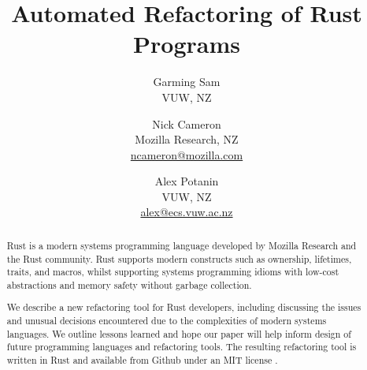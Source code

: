 \documentclass{sig-alternate-05-2015}
\begin{document}
\title{Automated Refactoring of Rust Programs}

\author{Garming Sam\\ VUW, NZ \and Nick Cameron\\ Mozilla Research, NZ\\ \url{ncameron@mozilla.com} \and Alex Potanin\\ VUW, NZ\\ \url{alex@ecs.vuw.ac.nz}}

\maketitle

\begin{abstract}
Rust is a modern systems programming language developed by Mozilla Research and the Rust community. Rust supports modern constructs such as ownership, lifetimes, traits, and macros, whilst supporting systems programming idioms with low-cost abstractions and memory safety without garbage collection.

We describe a new refactoring tool for Rust developers, including discussing the issues and unusual decisions encountered due to the complexities of modern systems languages. We outline lessons learned and hope our paper will help inform design of future programming languages and refactoring tools. The resulting refactoring tool is written in Rust and available from Github under an MIT license \cite{rrproject}.
\end{abstract}












\end{document}
